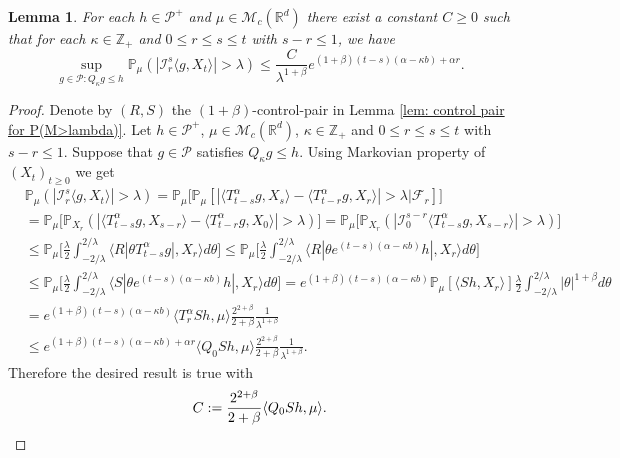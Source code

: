 \documentclass[12pt]{amsart}
\theoremstyle{plain}
\newtheorem{lem}[thm]{Lemma}
\theoremstyle{definition}
\numberwithin{equation}{section}
\begin{document}
\begin{lem}\label{lem: temp}
	For each $h \in \mathcal P^+$ and $\mu \in \mathcal M_c(\mathbb{R}^d)$ there exist a constant $C \geq 0$ such that for each $\kappa \in \mathbb Z_+ $ and $0\leq r\leq s\leq t$ with $s-r \leq 1$, we have
\[
    \sup_{g \in \mathcal P: Q_\kappa g\leq h}\mathbb P_{\mu}(|\mathcal I_r^s\langle g, X_t\rangle|>\lambda)
    \leq \frac{ C}{\lambda^{1+\beta}} e^{(1+\beta)(t-s)(\alpha- \kappa b)+ \alpha r}.
\]
\end{lem}
\begin{proof}
    Denote by $(R,S)$ the $(1+\beta)$-control-pair in Lemma \ref{lem: control pair for P(M>lambda)}.
    Let $h \in \mathcal P^+$, $\mu \in \mathcal M_c(\mathbb{R}^d)$, $\kappa \in \mathbb Z_+ $ and $0\leq r\leq s\leq t$ with $s-r \leq 1$.
    Suppose that $g\in \mathcal P$ satisfies $Q_\kappa g \leq h$.
    Using Markovian property of $(X_t)_{t\geq 0}$ we get
\begin{align}
    &\mathbb P_{\mu}(|\mathcal I_r^s\langle g, X_t\rangle|>\lambda)
    = \mathbb P_\mu \big[\mathbb P_\mu[|\langle T_{t-s}^\alpha g, X_{s}\rangle - \langle T_{t-r}^\alpha g, X_{r}\rangle|> \lambda\big| \mathscr F_r]\big]
    \\&= \mathbb P_\mu \big[\mathbb P_{X_r}(|\langle T_{t-s}^\alpha g, X_{s-r}\rangle - \langle T_{t-r}^\alpha g, X_{0}\rangle|> \lambda)\big]
    = \mathbb P_\mu \big[\mathbb P_{X_r}(|\mathcal I_0^{s-r}\langle T_{t-s}^\alpha g, X_{s-r}\rangle |> \lambda)\big]
    \\&\leq \mathbb P_\mu \Big[ \frac{\lambda}{2}\int_{-2/\lambda}^{2/\lambda}\langle R|\theta T^\alpha_{t-s}g|,X_r\rangle d\theta \Big]
    \leq \mathbb P_\mu \Big[ \frac{\lambda}{2}\int_{-2/\lambda}^{2/\lambda}\langle R|\theta e^{(t-s)(\alpha- \kappa b)}h|,X_r\rangle d\theta \Big]
	\\&\leq \mathbb P_\mu \Big[ \frac{\lambda}{2}\int_{-2/\lambda}^{2/\lambda}\langle S|\theta e^{(t-s)(\alpha- \kappa b)}h|,X_r\rangle d\theta \Big]
    = e^{(1+\beta)(t-s)(\alpha- \kappa b)} \mathbb P_\mu [ \langle Sh,X_r\rangle ] \frac{\lambda}{2}\int_{-2/\lambda}^{2/\lambda}|\theta|^{1+\beta}d\theta
    \\& = e^{(1+\beta)(t-s)(\alpha- \kappa b)} \langle T_r^\alpha Sh,\mu\rangle  \frac{2^{2+\beta}}{2+\beta}\frac{1}{\lambda^{1+\beta}}
    \\&\leq e^{(1+\beta)(t-s)(\alpha- \kappa b)+ \alpha r} \langle Q_0 Sh,\mu\rangle  \frac{2^{2+\beta}}{2+\beta}\frac{1}{\lambda^{1+\beta}}.
\end{align}
    Therefore the desired result is true with
\[
    C := \frac{2^{2+\beta}}{2+\beta}\langle Q_0Sh, \mu\rangle.
    \qedhere
\]
\end{proof}
\end{document}
